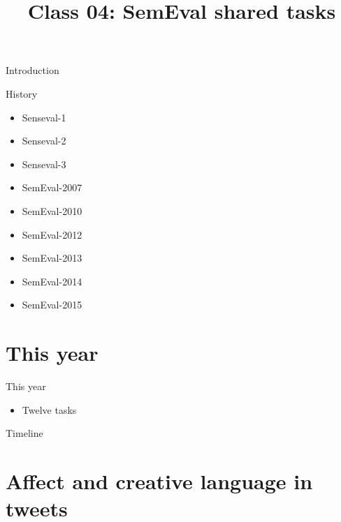 \documentclass[10pt, compress]{beamer}
\title{Class 04: SemEval shared tasks}
\begin{document}
\maketitle


\begin{frame}{Introduction}


\end{frame}


\begin{frame}{History}

\begin{itemize}
  \item Senseval-1
  \item Senseval-2
  \item Senseval-3
  \item SemEval-2007
  \item SemEval-2010
  \item SemEval-2012
  \item SemEval-2013
  \item SemEval-2014
  \item SemEval-2015
\end{itemize}

\end{frame}



\section{This year}

\begin{frame}{This year}

\begin{itemize}
  \item Twelve tasks
\end{itemize}

\end{frame}

\begin{frame}{Timeline}


\end{frame}


\section{Affect and creative language in tweets}
\end{document}
